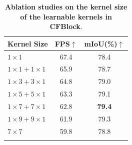 \documentclass[letterpaper]{article} %
\begin{document}
\begin{table}
	\centering
        \caption{\textbf{Ablation studies on the kernel size of the learnable kernels in CFBlock}.
        }
        \setlength{\tabcolsep}{1mm}
        \centering
        \begin{tabular}{l|c|c}
        \Xhline{1pt}
            Kernel Size
            &FPS$\uparrow$
            &mIoU(\%)$\uparrow$ \\
            \hline
            $1 \times 1$ &67.4 &78.4\\
            $1 \times 1 + 1 \times 1$ &65.9 &78.7\\
            $1 \times 3 + 3 \times 1$ &64.8 &79.0\\
            $1 \times 5 + 5 \times 1$ &63.3 &79.1\\
            $1 \times 7 + 7 \times 1$ &62.8 &\textbf{79.4}\\
            $1 \times 9 + 9 \times 1$ &61.9 &79.3\\
            $7 \times 7$ &59.8 &78.8\\
        \Xhline{1pt}
        \end{tabular}
		\label{supptab:Kernel Size Ablation}
\end{table}
\end{document}
